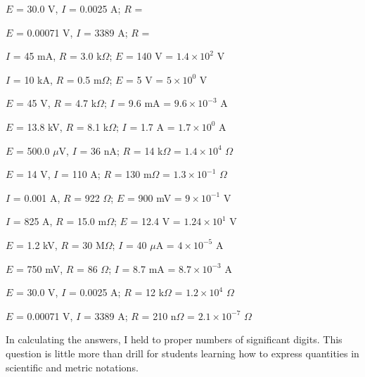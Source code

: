 \vskip 10pt

$E$ = 30.0 V, $I$ = 0.0025 A; \hskip 15pt $R$ = 

\vskip 10pt

$E$ = 0.00071 V, $I$ = 3389 A; \hskip 15pt $R$ =

\vskip 10pt







$I$ = 45 mA, $R$ = 3.0 k$\Omega$; \hskip 15pt $E$ = 140 V = $1.4 \times 10^2$ V

\vskip 10pt

$I$ = 10 kA, $R$ = 0.5 m$\Omega$; \hskip 15pt $E$ = 5 V = $5 \times 10^0$ V

\vskip 10pt

$E$ = 45 V, $R$ = 4.7 k$\Omega$; \hskip 15pt $I$ = 9.6 mA = $9.6 \times 10^{-3}$ A 

\vskip 10pt

$E$ = 13.8 kV, $R$ = 8.1 k$\Omega$; \hskip 15pt $I$ = 1.7 A = $1.7 \times 10^0$ A 

\vskip 10pt

$E$ = 500.0 $\mu$V, $I$ = 36 nA; \hskip 15pt $R$ = 14 k$\Omega$ = $1.4 \times 10^{4}$ $\Omega$

\vskip 10pt

$E$ = 14 V, $I$ = 110 A; \hskip 15pt $R$ = 130 m$\Omega$ = $1.3 \times 10^{-1}$ $\Omega$

\vskip 10pt

$I$ = 0.001 A, $R$ = 922 $\Omega$; \hskip 15pt $E$ = 900 mV = $9 \times 10^{-1}$ V

\vskip 10pt

$I$ = 825 A, $R$ = 15.0 m$\Omega$; \hskip 15pt $E$ = 12.4 V = $1.24 \times 10^{1}$ V

\vskip 10pt

$E$ = 1.2 kV, $R$ = 30 M$\Omega$; \hskip 15pt $I$ = 40 $\mu$A = $4 \times 10^{-5}$ A

\vskip 10pt

$E$ = 750 mV, $R$ = 86 $\Omega$; \hskip 15pt $I$ = 8.7 mA = $8.7 \times 10^{-3}$ A

\vskip 10pt

$E$ = 30.0 V, $I$ = 0.0025 A; \hskip 15pt $R$ = 12 k$\Omega$ = $1.2 \times 10^{4}$ $\Omega$

\vskip 10pt

$E$ = 0.00071 V, $I$ = 3389 A; \hskip 15pt $R$ = 210 n$\Omega$ = $2.1 \times 10^{-7}$ $\Omega$







In calculating the answers, I held to proper numbers of significant digits.  This question is little more than drill for students learning how to express quantities in scientific and metric notations.




